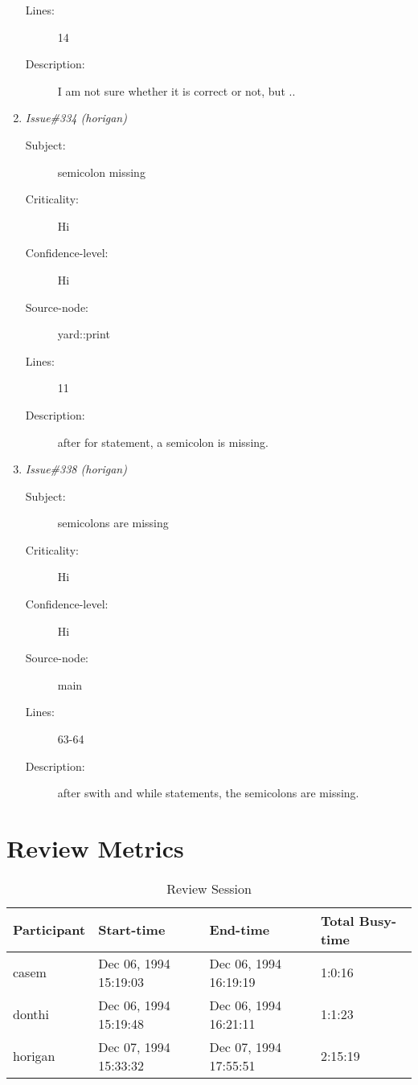 \begin{enumerate}
\begin{description}
\item [Lines:] 14

\item [Description:] I am not sure whether it is correct or not,
but ..
\end{description}
\item {\it Issue\#334 (horigan)}
\begin{description}
\item [Subject:] semicolon missing
\item [Criticality:] Hi
\item [Confidence-level:] Hi
\item [Source-node:] yard::print

\item [Lines:] 11

\item [Description:] after for statement, a semicolon is missing.
\end{description}
\item {\it Issue\#338 (horigan)}
\begin{description}
\item [Subject:] semicolons are missing
\item [Criticality:] Hi
\item [Confidence-level:] Hi
\item [Source-node:] main

\item [Lines:] 63-64

\item [Description:] after swith and while statements, the
semicolons are missing.
\end{description}
\end{enumerate}
\section{Review Metrics}
\begin{table}[hb]
\begin{center}
\begin{tabular}{|l|l|l|l|}
\hline
Participant & Start-time & End-time & Total Busy-time \\
\hline
casem & Dec 06, 1994 15:19:03 & Dec 06, 1994 16:19:19 & 1:0:16 \\
donthi & Dec 06, 1994 15:19:48 & Dec 06, 1994 16:21:11 & 1:1:23 \\
horigan & Dec 07, 1994 15:33:32 & Dec 07, 1994 17:55:51 & 2:15:19 \\
\hline
\end{tabular}
\end{center}
\caption{Review Session}
\end{table}


